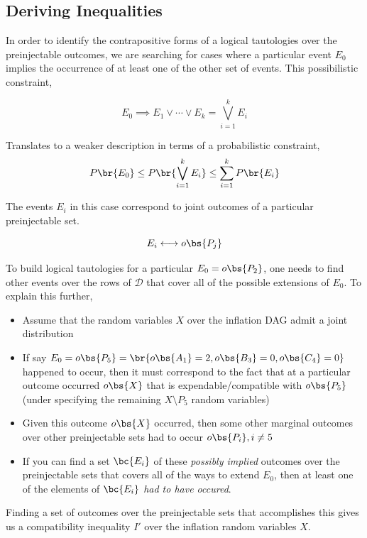 \documentclass{article}
\theoremstyle{definition}
\begin{document}
    \subsection*{Deriving Inequalities}
    In order to identify the contrapositive forms of a logical tautologies over the preinjectable outcomes, we are searching for cases where a particular event $E_0$ implies the occurrence of at least one of the other set of events. This possibilistic constraint,

    \[ E_0 \implies E_1 \lor \cdots \lor E_k = \bigvee_{i=1}^{k} E_i \]

    Translates to a weaker description in terms of a probabilistic constraint,
    \[ P\br{E_0} \leq P\br{\bigvee_{i=1}^{k} E_i} \leq \sum_{i=1}^{k} P\br{E_i}\]

    The events $E_i$ in this case correspond to joint outcomes of a particular preinjectable set.

    \[ E_i \longleftrightarrow o\bs{P_j} \]

    To build logical tautologies for a particular $E_0 = o\bs{P_2}$, one needs to find other events over the rows of $\mathcal{D}$ that cover all of the possible extensions of $E_0$. To explain this further,

    \begin{itemize}
        \item Assume that the random variables $X$ over the inflation DAG admit a joint distribution
        \item If say $E_0 = o\bs{P_5} = \br{o\bs{A_1} = 2, o\bs{B_3} = 0, o\bs{C_4} = 0}$ happened to occur, then it must correspond to the fact that at a particular outcome occurred $o\bs{X}$ that is expendable/compatible with $o\bs{P_5}$ (under specifying the remaining $X \setminus P_5$ random variables)
        \item Given this outcome $o\bs{X}$ occurred, then some other marginal outcomes over other preinjectable sets had to occur $o\bs{P_i}, i \neq 5$
        \item If you can find a set $\bc{E_i}$ of these \textit{possibly implied} outcomes over the preinjectable sets that covers all of the ways to extend $E_0$, then at least one of the elements of $\bc{E_i}$ \textit{had to have occured}.
    \end{itemize}

    Finding a set of outcomes over the preinjectable sets that accomplishes this gives us a compatibility inequality $I'$ over the inflation random variables $X$. \\
\end{document}
